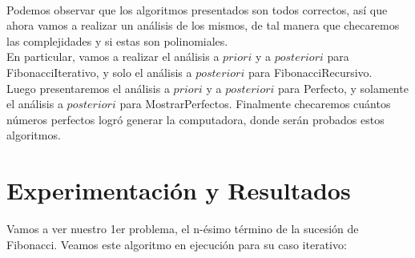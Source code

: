 \documentclass[12pt,twoside]{article}
\begin{document}
\newline
\\ Podemos observar que los algoritmos presentados son todos correctos, así que ahora vamos a realizar un análisis de los mismos, de tal manera que checaremos las complejidades y si estas son polinomiales.
\\ En particular, vamos a realizar el análisis a $priori$ y a $posteriori$ para FibonacciIterativo, y solo el análisis a $posteriori$ para FibonacciRecursivo.
\\ Luego presentaremos el análisis a $priori$ y a $posteriori$ para Perfecto, y solamente el análisis a $posteriori$ para MostrarPerfectos. Finalmente checaremos cuántos números perfectos logró generar la computadora, donde serán probados estos algoritmos.

\section{Experimentaci\'on y Resultados}
Vamos a ver nuestro 1er problema, el n-ésimo término de la sucesión de Fibonacci.
Veamos este algoritmo en ejecución para su caso iterativo:
\end{document}
